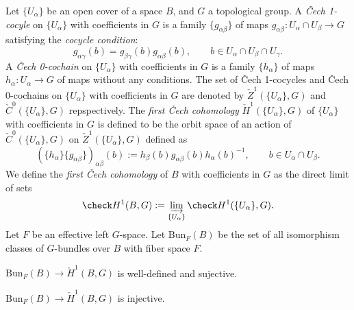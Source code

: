 \documentclass{../../large}
\begin{document}
\begin{prb}
Let $\{U_\alpha\}$ be an open cover of a space $B$, and $G$ a topological group.
A \emph{\v Cech 1-cocyle} on $\{U_\alpha\}$ with coefficients in $G$ is a family $\{g_{\alpha\beta}\}$ of maps $g_{\alpha\beta}:U_\alpha\cap U_\beta\to G$ satisfying the \emph{cocycle condition}:
\[g_{\alpha\gamma}(b)=g_{\beta\gamma}(b)g_{\alpha\beta}(b),\qquad b\in U_\alpha\cap U_\beta\cap U_\gamma.\]
A \emph{\v Cech 0-cochain} on $\{U_\alpha\}$ with coefficients in $G$ is a family $\{h_\alpha\}$ of maps $h_\alpha:U_\alpha\to G$ of maps without any conditions.
The set of \v Cech 1-cocycles and \v Cech 0-cochains on $\{U_\alpha\}$ with coefficients in $G$ are denoted by $\check Z^1(\{U_\alpha\},G)$ and $\check C^0(\{U_\alpha\},G)$ repspectively.
The \emph{first \v Cech cohomology} $\check H^1(\{U_\alpha\},G)$ of $\{U_\alpha\}$ with coefficients in $G$ is defined to be the orbit space of an action of $\check C^0(\{U_\alpha\},G)$ on $\check Z^1(\{U_\alpha\},G)$ defined as
\[(\{h_\alpha\}\{g_{\alpha\beta}\})_{\alpha\beta}(b):=h_\beta(b)g_{\alpha\beta}(b)h_\alpha(b)^{-1},
\qquad b\in U_\alpha\cap U_\beta.\]
We define the \emph{first \v Cech cohomology} of $B$ with coefficients in $G$ as the direct limit of sets
\[\check H^1(B,G):=\varinjlim_{\{U_\alpha\}}\check H^1(\{U_\alpha\},G).\]
Let $F$ be an effective left $G$-space.
Let $\mathrm{Bun}_F(B)$ be the set of all isomorphism classes of $G$-bundles over $B$ with fiber space $F$.
\begin{parts}
\item $\mathrm{Bun}_F(B)\to\check H^1(B,G)$ is well-defined and sujective.
\item $\mathrm{Bun}_F(B)\to\check H^1(B,G)$ is injective.
\end{parts}
\end{prb}
\end{document}
